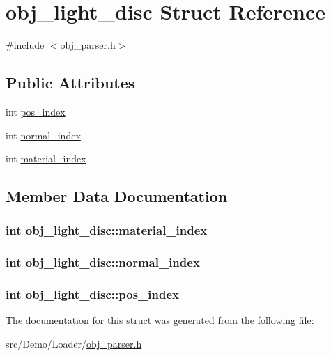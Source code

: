 \hypertarget{structobj__light__disc}{\section{obj\+\_\+light\+\_\+disc Struct Reference}
\label{structobj__light__disc}
}


{\ttfamily \#include $<$obj\+\_\+parser.\+h$>$}

\subsection*{Public Attributes}
\begin{DoxyCompactItemize}
\item 
int \hyperlink{structobj__light__disc_a06e88be817f6fc3b1ad8338a05d004db}{pos\+\_\+index}
\item 
int \hyperlink{structobj__light__disc_abff6571d08e00cab1cf246b460487076}{normal\+\_\+index}
\item 
int \hyperlink{structobj__light__disc_ab3f2c2e21bdda9da7efb82e9fb250cb0}{material\+\_\+index}
\end{DoxyCompactItemize}


\subsection{Member Data Documentation}
\hypertarget{structobj__light__disc_ab3f2c2e21bdda9da7efb82e9fb250cb0}{
\subsubsection[{material\+\_\+index}]{\setlength{\rightskip}{0pt plus 5cm}int obj\+\_\+light\+\_\+disc\+::material\+\_\+index}}\label{structobj__light__disc_ab3f2c2e21bdda9da7efb82e9fb250cb0}
\hypertarget{structobj__light__disc_abff6571d08e00cab1cf246b460487076}{
\subsubsection[{normal\+\_\+index}]{\setlength{\rightskip}{0pt plus 5cm}int obj\+\_\+light\+\_\+disc\+::normal\+\_\+index}}\label{structobj__light__disc_abff6571d08e00cab1cf246b460487076}
\hypertarget{structobj__light__disc_a06e88be817f6fc3b1ad8338a05d004db}{
\subsubsection[{pos\+\_\+index}]{\setlength{\rightskip}{0pt plus 5cm}int obj\+\_\+light\+\_\+disc\+::pos\+\_\+index}}\label{structobj__light__disc_a06e88be817f6fc3b1ad8338a05d004db}


The documentation for this struct was generated from the following file\+:\begin{DoxyCompactItemize}
\item 
src/\+Demo/\+Loader/\hyperlink{obj__parser_8h}{obj\+\_\+parser.\+h}\end{DoxyCompactItemize}
